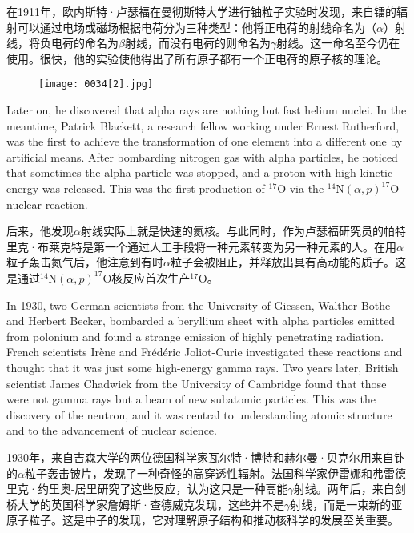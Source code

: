 \documentclass[dvipsnames, svgnames,a4paper,11pt]{article}
\begin{document}
在1911年，欧内斯特·卢瑟福在曼彻斯特大学进行铀粒子实验时发现，来自镭的辐射可以通过电场或磁场根据电荷分为三种类型：他将正电荷的射线命名为（$\alpha$）射线，将负电荷的命名为$\beta$射线，而没有电荷的则命名为$\gamma$射线。这一命名至今仍在使用。很快，他的实验使他得出了所有原子都有一个正电荷的原子核的理论。

\begin{figure}[htbp]
      \centering
      \texttt{[image: 0034[2].jpg]}
       \label{fig23}
\end{figure}


Later on, he discovered that alpha rays are nothing but fast helium nuclei. In the meantime, Patrick Blackett, a research fellow working under Ernest Rutherford, was the first to achieve the transformation of one element into a different one by artificial means. After bombarding nitrogen gas with alpha particles, he noticed that sometimes the alpha particle was stopped, and a proton with high kinetic energy was released. This was the first production of \(^{17}\text{O}\) via the \(^{14}\text{N} (\alpha, p)^{17}\text{O}\) nuclear reaction.

后来，他发现$\alpha$射线实际上就是快速的氦核。与此同时，作为卢瑟福研究员的帕特里克·布莱克特是第一个通过人工手段将一种元素转变为另一种元素的人。在用$\alpha$粒子轰击氮气后，他注意到有时$\alpha$粒子会被阻止，并释放出具有高动能的质子。这是通过\(^{14}\text{N} (\alpha, p)^{17}\text{O}\)核反应首次生产\(^{17}\text{O}\)。

In 1930, two German scientists from the University of Giessen, Walther Bothe and Herbert Becker, bombarded a beryllium sheet with alpha particles emitted from polonium and found a strange emission of highly penetrating radiation. French scientists Irène and Frédéric Joliot-Curie investigated these reactions and thought that it was just some high-energy gamma rays. Two years later, British scientist James Chadwick from the University of Cambridge found that those were not gamma rays but a beam of new subatomic particles. This was the discovery of the neutron, and it was central to understanding atomic structure and to the advancement of nuclear science.

1930年，来自吉森大学的两位德国科学家瓦尔特·博特和赫尔曼·贝克尔用来自钋的$\alpha$粒子轰击铍片，发现了一种奇怪的高穿透性辐射。法国科学家伊雷娜和弗雷德里克·约里奥-居里研究了这些反应，认为这只是一种高能$\gamma$射线。两年后，来自剑桥大学的英国科学家詹姆斯·查德威克发现，这些并不是$\gamma$射线，而是一束新的亚原子粒子。这是中子的发现，它对理解原子结构和推动核科学的发展至关重要。
\end{document}

